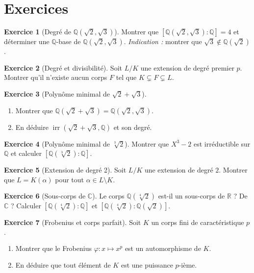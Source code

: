 \documentclass[12pt,a4paper,openany]{book}
\theoremstyle{definition}
\newtheorem{exercice}{Exercice}[chapter]
\newcommand{\Q}{\mathbb{Q}}
\newcommand{\R}{\mathbb{R}}
\newcommand{\C}{\mathbb{C}}
\newcommand{\irr}{\operatorname{irr}}
\begin{document}
\section{Exercices}
\label{sec:exercices-chap8}

\begin{exercice}[Degré de $\Q(\sqrt{2}, \sqrt{3})$]\label{exo:Q-sqrt2-sqrt3}
Montrer que $[\Q(\sqrt{2}, \sqrt{3}):\Q] = 4$ et déterminer une $\Q$-base de
$\Q(\sqrt{2}, \sqrt{3})$.
\emph{Indication :} montrer que $\sqrt{3} \notin \Q(\sqrt{2})$.
\end{exercice}

\begin{exercice}[Degré et divisibilité]\label{exo:degre-divisibilite}
Soit $L/K$ une extension de degré premier $p$. Montrer qu'il n'existe aucun
corps $F$ tel que $K \subsetneq F \subsetneq L$.
\end{exercice}

\begin{exercice}[Polynôme minimal de $\sqrt{2}+\sqrt{3}$]\label{exo:sqrt2+sqrt3}
\begin{enumerate}[label=(\alph*)]
  \item Montrer que $\Q(\sqrt{2}+\sqrt{3}) = \Q(\sqrt{2},\sqrt{3})$.
  \item En déduire $\irr(\sqrt{2}+\sqrt{3},\Q)$ et son degré.
\end{enumerate}
\end{exercice}

\begin{exercice}[{Polynôme minimal de $\sqrt[3]{2}$}]\label{exo:cbrt2-polymin}
Montrer que $X^3 - 2$ est irréductible sur $\Q$ et calculer $[\Q(\sqrt[3]{2}):\Q]$.
\end{exercice}

\begin{exercice}[Extension de degré 2]\label{exo:ext-degre2}
Soit $L/K$ une extension de degré $2$. Montrer que $L = K(\alpha)$ pour tout
$\alpha \in L \setminus K$.
\end{exercice}

\begin{exercice}[Sous-corps de $\C$]\label{exo:sous-corps-C}
Le corps $\Q(\sqrt[4]{2})$ est-il un sous-corps de $\R$ ? De $\C$ ?
Calculer $[\Q(\sqrt[4]{2}):\Q]$ et $[\Q(\sqrt[4]{2}):\Q(\sqrt{2})]$.
\end{exercice}

\begin{exercice}[Frobenius et corps parfait]\label{exo:frobenius}
Soit $K$ un corps fini de caractéristique $p$.
\begin{enumerate}[label=(\alph*)]
  \item Montrer que le Frobenius $\varphi \colon x \mapsto x^p$ est un
    automorphisme de $K$.
  \item En déduire que tout élément de $K$ est une puissance $p$-ième.
\end{enumerate}
\end{exercice}
\end{document}
